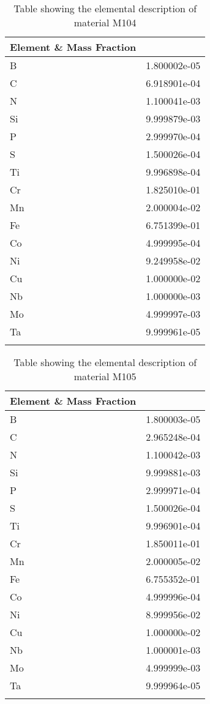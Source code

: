 \begin{centering}
\begin{longtable}[ht!]
{ p{} | p{} }
\hline
Element \& Mass Fraction\\
\hline
B &  1.800002e-05\\
C &  6.918901e-04\\
N &  1.100041e-03\\
Si &  9.999879e-03\\
P &  2.999970e-04\\
S &  1.500026e-04\\
Ti &  9.996898e-04\\
Cr &  1.825010e-01\\
Mn &  2.000004e-02\\
Fe &  6.751399e-01\\
Co &  4.999995e-04\\
Ni &  9.249958e-02\\
Cu &  1.000000e-02\\
Nb &  1.000000e-03\\
Mo &  4.999997e-03\\
Ta &  9.999961e-05\\

\caption{Table showing the elemental description of material M104}
\label{table:material_M104}
\end{longtable}
\clearpage

\begin{longtable}[ht!]
  { p{} | p{} }
\hline
Element \& Mass Fraction\\
\hline
B &  1.800003e-05\\
C &  2.965248e-04\\
N &  1.100042e-03\\
Si &  9.999881e-03\\
P &  2.999971e-04\\
S &  1.500026e-04\\
Ti &  9.996901e-04\\
Cr &  1.850011e-01\\
Mn &  2.000005e-02\\
Fe &  6.755352e-01\\
Co &  4.999996e-04\\
Ni &  8.999956e-02\\
Cu &  1.000000e-02\\
Nb &  1.000001e-03\\
Mo &  4.999999e-03\\
Ta &  9.999964e-05\\

\caption{Table showing the elemental description of material M105}
\label{table:material_M105}
\end{longtable}
\clearpage


\end{centering}
